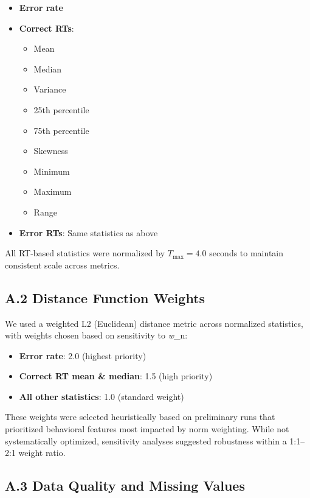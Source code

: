 \documentclass[
  11pt,
]{article}
\providecommand{\tightlist}{%
  \setlength{\itemsep}{0pt}\setlength{\parskip}{0pt}}
\begin{document}
\begin{itemize}
\tightlist
\item
  \textbf{Error rate}
\item
  \textbf{Correct RTs}:

  \begin{itemize}
  \tightlist
  \item
    Mean
  \item
    Median
  \item
    Variance
  \item
    25th percentile
  \item
    75th percentile
  \item
    Skewness
  \item
    Minimum
  \item
    Maximum
  \item
    Range
  \end{itemize}
\item
  \textbf{Error RTs}: Same statistics as above
\end{itemize}

All RT-based statistics were normalized by \(T_{\text{max}} = 4.0\)
seconds to maintain consistent scale across metrics.

\subsection{A.2 Distance Function
Weights}\label{a.2-distance-function-weights}

We used a weighted L2 (Euclidean) distance metric across normalized
statistics, with weights chosen based on sensitivity to \emph{w}\_n:

\begin{itemize}
\tightlist
\item
  \textbf{Error rate}: 2.0 (highest priority)
\item
  \textbf{Correct RT mean \& median}: 1.5 (high priority)
\item
  \textbf{All other statistics}: 1.0 (standard weight)
\end{itemize}

These weights were selected heuristically based on preliminary runs that
prioritized behavioral features most impacted by norm weighting. While
not systematically optimized, sensitivity analyses suggested robustness
within a 1:1--2:1 weight ratio.

\subsection{A.3 Data Quality and Missing
Values}\label{a.3-data-quality-and-missing-values}
\end{document}
